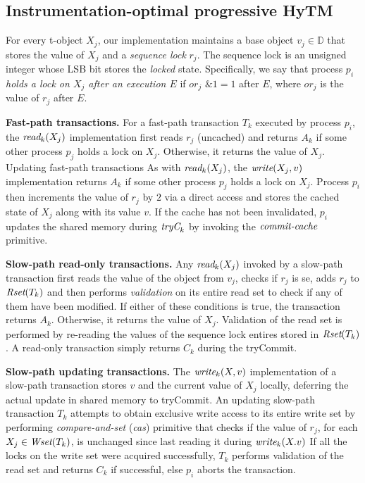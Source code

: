 
\subsection{Instrumentation-optimal progressive HyTM }
\label{sec:hytm1}
%
For every t-object $X_j$, our implementation maintains a base object $v_j\in \mathbb{D}$ that stores the value of $X_j$
and a \emph{sequence lock} $r_{j}$. The sequence lock is an unsigned integer whose LSB bit stores the \emph{locked} state.
Specifically, we say that process $p_i$ \emph{holds a lock on $X_j$ after an execution $E$} if
$\textit{or}_j$ $\mathrel{\&} 1=1$ after $E$, where $\textit{or}_j$ is the value of $r_j$ after $E$.

\vspace{1mm}\noindent\textbf{Fast-path transactions.}
For a fast-path transaction $T_k$ executed by process $p_i$, the $\textit{read}_k(X_j)$ implementation first reads $r_j$ (uncached)
and returns $A_k$ if some other process $p_j$ holds a lock on $X_j$.
Otherwise, it returns the value of $X_j$.
Updating fast-path transactions 
As with $\textit{read}_k(X_j)$, the $\textit{write} (X_j,v)$ implementation returns $A_k$ if some other process $p_j$ holds a lock on $X_j$.
Process $p_i$ then increments the value of $r_j$ by $2$ via a direct access and stores the cached state of $X_j$ along with its value $v$.
If the cache has not been invalidated, $p_i$ updates the shared memory
during $\textit{tryC}_k$ by invoking the $\ms{commit-cache}$ primitive.

\vspace{1mm}\noindent\textbf{Slow-path read-only transactions.}
Any $\textit{read}_k(X_j)$ invoked by a slow-path transaction first reads the value of the object from $v_j$, 
checks if $r_j$ is se, adds $r_j$ to $\textit{Rset}(T_k)$
and then performs \emph{validation} on its entire read set to check if any of them have been modified. 
If either of these conditions is true,
the transaction returns $A_k$. Otherwise, it returns the value of $X_j$. 
Validation of the read set is performed by re-reading the values of the sequence lock entires stored in $\textit{Rset}(T_k)$.
A read-only transaction simply returns $C_k$ during the tryCommit.

\vspace{1mm}\noindent\textbf{Slow-path updating transactions.}
The $\textit{write}_k(X,v)$ implementation of a slow-path transaction stores
$v$ and the current value of $X_j$ locally, 
deferring the actual update in shared memory to tryCommit. 
An updating slow-path transaction $T_k$ attempts to obtain exclusive write access to its 
entire write set by performing \emph{compare-and-set} (\emph{cas})
primitive that checks if the value of $r_j$, for each $X_j\in \textit{Wset}(T_k)$, is unchanged since last reading it during $\textit{write}_k(X.v)$
If all the locks on the write set were acquired successfully, $T_k$ performs validation of the read set and returns $C_k$ if successful, else $p_i$ aborts the transaction.

